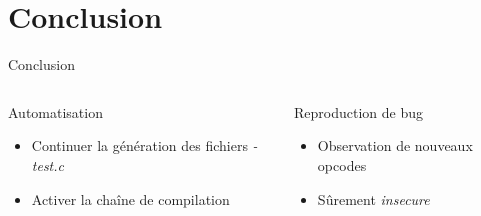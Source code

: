 \documentclass[A4,svgnames,9pt,aspectratio=169]{beamer}
\begin{document}

\section{Conclusion}
\frame{\sectionpage}

\begin{frame}{Conclusion}

  \begin{columns}
    \begin{column}{0.5\textwidth}
      \begin{block}{Automatisation}
        \begin{itemize}
          \item Continuer la génération des fichiers \textit{-test.c}
          \item Activer la chaîne de compilation
        \end{itemize}
      \end{block}
    \end{column}
    \pause
    \begin{column}{0.5\textwidth}
      \begin{block}{Reproduction de bug}
        \begin{itemize}
          \item Observation de nouveaux opcodes
          \item Sûrement \textit{insecure}
        \end{itemize}
      \end{block}
    \end{column}
  \end{columns}

\end{frame}


\frame{\merci}
\end{document}
